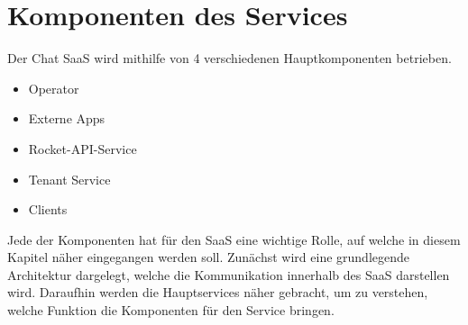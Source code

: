 \chapter{Komponenten des Services}
\label{chap:komponenten}

Der Chat \ac{SaaS} wird mithilfe von 4 verschiedenen Hauptkomponenten betrieben.
\begin{itemize}
  \item Operator
  \item Externe Apps
  \item Rocket-API-Service
  \item Tenant Service
  \item Clients
\end{itemize}

Jede der Komponenten hat für den \ac{SaaS} eine wichtige Rolle, auf welche in diesem Kapitel näher eingegangen werden soll.
Zunächst wird eine grundlegende Architektur dargelegt, welche die Kommunikation innerhalb des \ac{SaaS} darstellen wird.
Daraufhin werden die Hauptservices näher gebracht, um zu verstehen, welche Funktion die Komponenten für den Service bringen.
